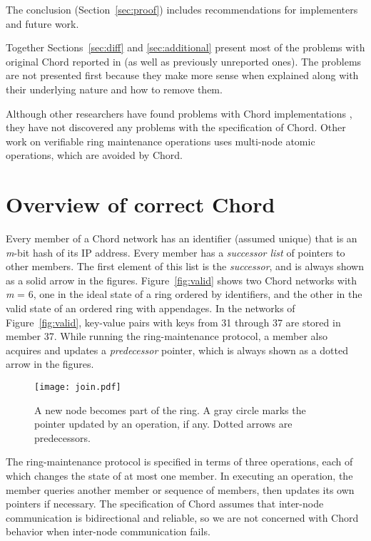 \documentclass[conference]{IEEEtran}
\begin{document}
The conclusion
(Section~\ref{sec:proof}) includes recommendations for implementers
and future work.

Together Sections~\ref{sec:diff} and
\ref{sec:additional} present most of the problems with original
Chord reported
in \cite{chord-ccr} (as well as previously unreported ones).
The problems are not presented first because they make more sense when
explained along with their underlying nature and how to remove them.

Although other researchers have found problems with Chord implementations
\cite{chord-nontrans,mace,crystalball}, they have not discovered any
problems with the specification of Chord.
Other work on verifiable ring maintenance operations \cite{ringtop}
uses multi-node atomic operations, which are avoided by Chord.

\section{Overview of correct Chord}
\label{sec:overview}

Every member of a Chord network has an identifier (assumed unique) that
is an {\it m}-bit hash of its IP address.
Every member has a {\it successor list} of pointers to other members.
The first element of this list is the {\it successor}, and is
always shown as a solid
arrow in the figures.
Figure~\ref{fig:valid} shows two Chord networks with {\it m} = 6,
one in the ideal state of a ring ordered by identifiers,
and the other
in the valid state of an ordered ring with appendages.
In the networks of Figure~\ref{fig:valid}, key-value pairs with keys
from 31 through 37 are stored in member 37.
While running the ring-maintenance protocol, a member also acquires and
updates a {\it predecessor} pointer, which is always shown as a dotted
arrow in the figures.

\begin{figure*}
\centering
\texttt{[image: join.pdf]}
\caption{A new node becomes part of the ring.
A gray circle marks the pointer updated by an operation, if any.
Dotted arrows are predecessors.}
\label{fig:join}
\end{figure*}

The ring-maintenance protocol is specified in terms of three
operations, each of
which changes the state of at most one member.
In executing an operation, the member queries another member or
sequence of members, then
updates its own pointers if necessary.
The specification of Chord assumes that inter-node communication is
bidirectional and
reliable, so we are not concerned with Chord behavior when inter-node
communication fails.
\end{document}
